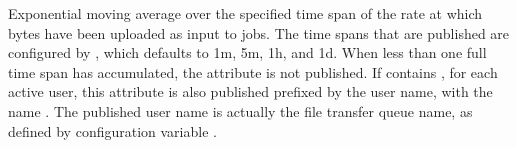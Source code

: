\begin{description}
\item[\AdAttr{FileTransferUploadBytesPerSecond\_<timespan>}]
  Exponential moving average over the specified time span of the rate
  at which bytes have been uploaded as input to jobs.
  The time spans that are published are configured by
  , which defaults to
  1m, 5m, 1h, and 1d.  When less than one full time span has
  accumulated, the attribute is not published.
  If  contains ,
  for each active user, this attribute is also published prefixed by
  the user name, with the name
  .
  The published user name is actually the file transfer queue name, as
  defined by configuration variable .

\end{description}

